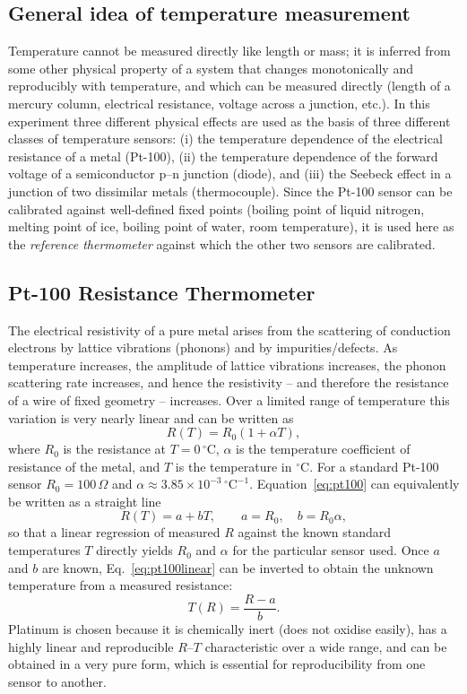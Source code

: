 \documentclass[11pt,a4paper]{article}
\begin{document}
\subsection{General idea of temperature measurement}
Temperature cannot be measured directly like length or mass; it is inferred from some other physical property of a system that changes monotonically and reproducibly with temperature, and which can be measured directly (length of a mercury column, electrical resistance, voltage across a junction, etc.). In this experiment three different physical effects are used as the basis of three different classes of temperature sensors: (i) the temperature dependence of the electrical resistance of a metal (Pt-100), (ii) the temperature dependence of the forward voltage of a semiconductor p--n junction (diode), and (iii) the Seebeck effect in a junction of two dissimilar metals (thermocouple). Since the Pt-100 sensor can be calibrated against well-defined fixed points (boiling point of liquid nitrogen, melting point of ice, boiling point of water, room temperature), it is used here as the \emph{reference thermometer} against which the other two sensors are calibrated.

\subsection{Pt-100 Resistance Thermometer}
The electrical resistivity of a pure metal arises from the scattering of conduction electrons by lattice vibrations (phonons) and by impurities/defects. As temperature increases, the amplitude of lattice vibrations increases, the phonon scattering rate increases, and hence the resistivity -- and therefore the resistance of a wire of fixed geometry -- increases. Over a limited range of temperature this variation is very nearly linear and can be written as
\begin{equation}
    R(T) = R_0\left(1 + \alpha T\right),
    \label{eq:pt100}
\end{equation}
where $R_0$ is the resistance at $T = 0\,^{\circ}\mathrm{C}$, $\alpha$ is the temperature coefficient of resistance of the metal, and $T$ is the temperature in $^{\circ}\mathrm{C}$. For a standard Pt-100 sensor $R_0 = 100\,\Omega$ and $\alpha \approx 3.85\times10^{-3}\,^{\circ}\mathrm{C}^{-1}$. Equation~\eqref{eq:pt100} can equivalently be written as a straight line
\begin{equation}
    R(T) = a + bT, \qquad a = R_0, \quad b = R_0\alpha,
    \label{eq:pt100linear}
\end{equation}
so that a linear regression of measured $R$ against the known standard temperatures $T$ directly yields $R_0$ and $\alpha$ for the particular sensor used. Once $a$ and $b$ are known, Eq.~\eqref{eq:pt100linear} can be inverted to obtain the unknown temperature from a measured resistance:
\begin{equation}
    T(R) = \frac{R - a}{b}.
    \label{eq:pt100inv}
\end{equation}
Platinum is chosen because it is chemically inert (does not oxidise easily), has a highly linear and reproducible $R$--$T$ characteristic over a wide range, and can be obtained in a very pure form, which is essential for reproducibility from one sensor to another.
\end{document}
